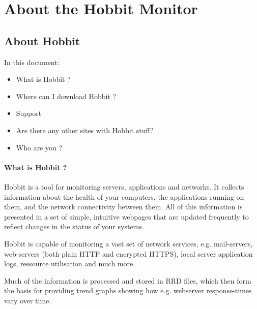 \chapter{About the Hobbit Monitor}
\section{About Hobbit}


 In this document:
\begin{itemize}
\item What is Hobbit ?
\item Where can I download Hobbit ?
\item Support
\item Are there any other sites with Hobbit stuff?
\item Who are you ?

\end{itemize}
\subsubsection{What is Hobbit ?}


 Hobbit is a tool for monitoring servers, applications and networks. It collects information about the health of your computers, the applications running on them, and the network connectivity between them. All of this information is presented in a set of simple, intuitive webpages that are updated frequently to reflect changes in the status of your systems.


 Hobbit is capable of monitoring a vast set of network services, e.g. mail-servers, web-servers (both plain HTTP and encrypted HTTPS), local server application logs, ressource utilisation and much more.


 Much of the information is processed and stored in RRD files, which then form the basis for providing trend graphs showing how e.g. webserver response-times vary over time.


